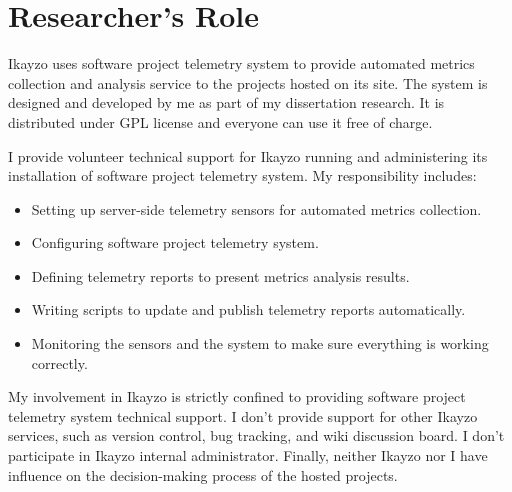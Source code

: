 
\section{Researcher's Role} \label{EvaluationInIkayzo:Role}

Ikayzo uses software project telemetry system to provide automated metrics collection and analysis service to the projects hosted on its site. The system is designed and developed by me as part of my dissertation research. It is distributed under GPL license and everyone can use it free of charge. 

I provide volunteer technical support for Ikayzo running and administering its installation of software project telemetry system. My responsibility includes:
\begin{itemize}
	\item Setting up server-side telemetry sensors for automated metrics collection.
	\item Configuring software project telemetry system.
	\item Defining telemetry reports to present metrics analysis results.
	\item Writing scripts to update and publish telemetry reports automatically. 
	\item Monitoring the sensors and the system to make sure everything is working correctly.
\end{itemize}

My involvement in Ikayzo is strictly confined to providing software project telemetry system technical support. I don't provide support for other Ikayzo services, such as version control, bug tracking, and wiki discussion board. I don't participate in Ikayzo internal administrator. Finally, neither Ikayzo nor I have influence on the decision-making process of the hosted projects. 








